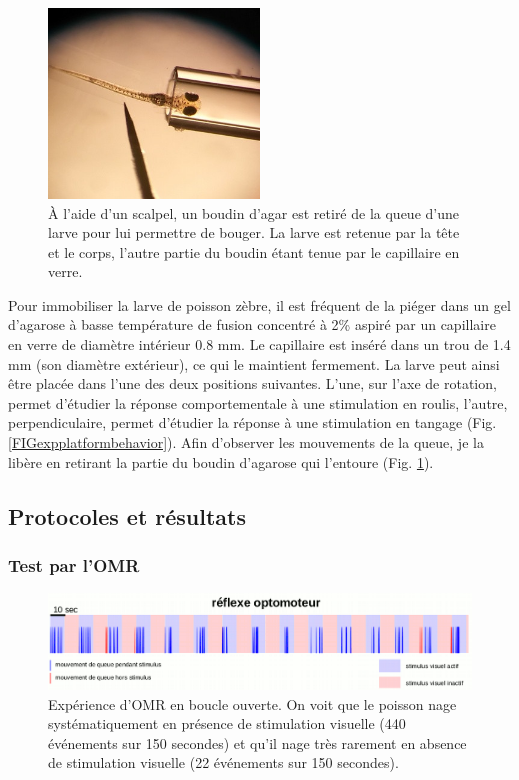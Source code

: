 \begin{figure}[b]
    \centering
    \includegraphics[width=0.5\textwidth]{./files/prepa_larve.jpg}
    \caption{À l'aide d'un scalpel, un boudin d'agar est retiré de la queue d'une larve pour lui permettre de bouger. La larve est retenue par la tête et le corps, l'autre partie du boudin étant tenue par le capillaire en verre.
    \label{FIGagar}}
    \end{figure}

Pour immobiliser la larve de poisson zèbre, il est fréquent de la piéger dans un gel d'agarose à basse température de fusion concentré à 2\% aspiré par un capillaire en verre de diamètre intérieur 0.8 mm. Le capillaire est inséré dans un trou de 1.4 mm (son diamètre extérieur), ce qui le maintient fermement. La larve peut ainsi être placée dans l'une des deux positions suivantes. L'une, sur l'axe de rotation, permet d'étudier la réponse comportementale à une stimulation en roulis, l'autre, perpendiculaire, permet d'étudier la réponse à une stimulation en tangage (Fig. \ref{FIGexpplatformbehavior}). Afin d'observer les mouvements de la queue, je la libère en retirant la partie du boudin d'agarose qui l'entoure (Fig. \ref{FIGagar}). 


\subsection{Protocoles et résultats}

\subsubsection{Test par l'OMR}

\begin{figure}
    \centering
    \includegraphics[width=\textwidth]{./files/omr.png}
    \caption{Expérience d'OMR en boucle ouverte. On voit que le poisson nage systématiquement en présence de stimulation visuelle (440 événements sur 150 secondes) et qu'il nage très rarement en absence de stimulation visuelle (22 événements sur 150 secondes).}
    \label{FigOMRopenloop}
    \end{figure}

